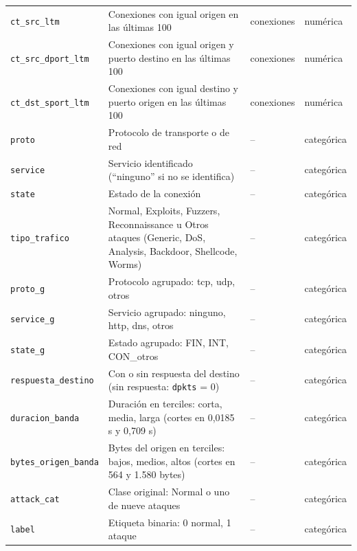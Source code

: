 \begin{longtable}{@{}>{\raggedright\arraybackslash}p{3.6cm}>{\raggedright\arraybackslash}p{6.6cm}>{\raggedright\arraybackslash}p{2.8cm}>{\raggedright\arraybackslash}p{1.8cm}@{}}
\texttt{ct\_src\_ltm} & Conexiones con igual origen en las últimas 100 & conexiones & numérica \\
\texttt{ct\_src\_dport\_ltm} & Conexiones con igual origen y puerto destino en las últimas 100 & conexiones & numérica \\
\texttt{ct\_dst\_sport\_ltm} & Conexiones con igual destino y puerto origen en las últimas 100 & conexiones & numérica \\
\texttt{proto} & Protocolo de transporte o de red & -- & categórica \\
\texttt{service} & Servicio identificado (``ninguno'' si no se identifica) & -- & categórica \\
\texttt{state} & Estado de la conexión & -- & categórica \\
\texttt{tipo\_trafico} & Normal, Exploits, Fuzzers, Reconnaissance u Otros ataques (Generic, DoS, Analysis, Backdoor, Shellcode, Worms) & -- & categórica \\
\texttt{proto\_g} & Protocolo agrupado: tcp, udp, otros & -- & categórica \\
\texttt{service\_g} & Servicio agrupado: ninguno, http, dns, otros & -- & categórica \\
\texttt{state\_g} & Estado agrupado: FIN, INT, CON\_otros & -- & categórica \\
\texttt{respuesta\_destino} & Con o sin respuesta del destino (sin respuesta: \texttt{dpkts} = 0) & -- & categórica \\
\texttt{duracion\_banda} & Duración en terciles: corta, media, larga (cortes en 0,0185 s y 0,709 s) & -- & categórica \\
\texttt{bytes\_origen\_banda} & Bytes del origen en terciles: bajos, medios, altos (cortes en 564 y 1.580 bytes) & -- & categórica \\
\texttt{attack\_cat} & Clase original: Normal o uno de nueve ataques & -- & categórica \\
\texttt{label} & Etiqueta binaria: 0 normal, 1 ataque & -- & categórica \\
\end{longtable}
\endgroup


